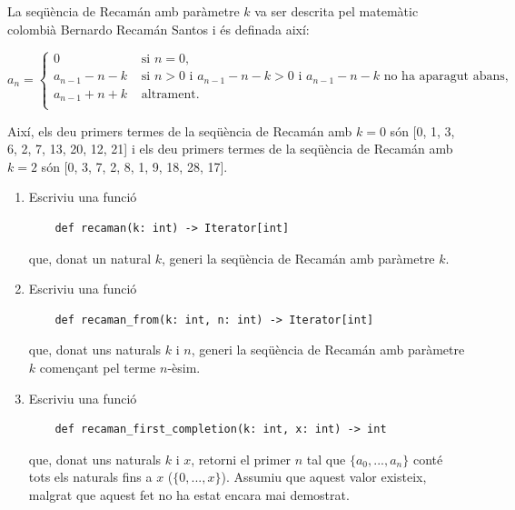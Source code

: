 
\UsePython

\Statement

La seqüència de Recamán amb paràmetre $k$ va ser descrita pel matemàtic colombià Bernardo Recamán Santos i és definada així:

\[
a_n = \begin{cases}
    0 & \text{ si $n=0$,}\\
    a_{n-1}-n-k & \text{ si $n>0$ i $a_{n-1}-n-k>0$ i $a_{n-1}-n-k$ no ha
aparagut abans,}\\
    a_{n-1}+n+k & \text{ altrament.}\\
\end{cases}
\]

\smallskip

Així, els deu primers termes de la seqüència de Recamán amb $k=0$ són [0, 1, 3, 6, 2, 7, 13, 20, 12, 21]
i els deu primers termes de la seqüència de Recamán amb $k=2$ són [0, 3, 7, 2, 8, 1, 9, 18, 28, 17].

\begin{enumerate}

    \item Escriviu una funció

    \begin{lstlisting}
    def recaman(k: int) -> Iterator[int]
    \end{lstlisting}\vspace*{-6mm}

    que, donat un natural $k$, generi la seqüència de Recamán amb paràmetre $k$.

    \item Escriviu una funció

    \begin{lstlisting}
    def recaman_from(k: int, n: int) -> Iterator[int]
    \end{lstlisting}\vspace*{-6mm}

    que, donat uns naturals $k$ i $n$, generi la seqüència de Recamán amb paràmetre $k$ començant pel terme $n$-èsim.

    \item Escriviu una funció

    \begin{lstlisting}
    def recaman_first_completion(k: int, x: int) -> int
    \end{lstlisting}\vspace*{-6mm}

    que, donat uns naturals $k$ i $x$, retorni el primer $n$ tal que $\{a_0,...,a_n\}$ conté tots els naturals fins a $x$ ($\{0,...,x\}$). Assumiu que aquest valor existeix, malgrat que aquest fet no ha estat encara mai demostrat.


\end{enumerate}

